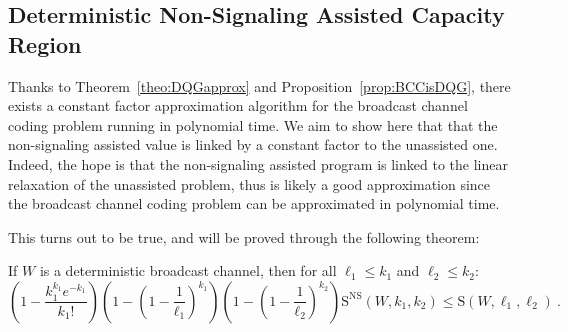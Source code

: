 \subsection{Deterministic Non-Signaling Assisted Capacity Region}
Thanks to Theorem~\ref{theo:DQGapprox} and Proposition~\ref{prop:BCCisDQG}, there exists a constant factor approximation algorithm for the broadcast channel coding problem running in polynomial time. We aim to show here that that the non-signaling assisted value is linked by a constant factor to the unassisted one. Indeed, the hope is that the non-signaling assisted program is linked to the linear relaxation of the unassisted problem, thus is likely a good approximation since the broadcast channel coding problem can be approximated in polynomial time.

This turns out to be true, and will be proved through the following theorem:

\begin{theorem}
  \label{theo:NSdet}
  If $W$ is a deterministic broadcast channel, then for all $\ell_1 \leq k_1$ and $\ell_2 \leq k_2$:
  \[ \left(1 - \frac{k_1^{k_1}e^{-k_1}}{k_1!}\right)\left(1-\left(1-\frac{1}{\ell_1}\right)^{k_1}\right)\left(1-\left(1-\frac{1}{\ell_2}\right)^{k_2}\right)\mathrm{S}^{\mathrm{NS}}(W,k_1,k_2) \leq \mathrm{S}(W,\ell_1,\ell_2)\ . \]
\end{theorem}

